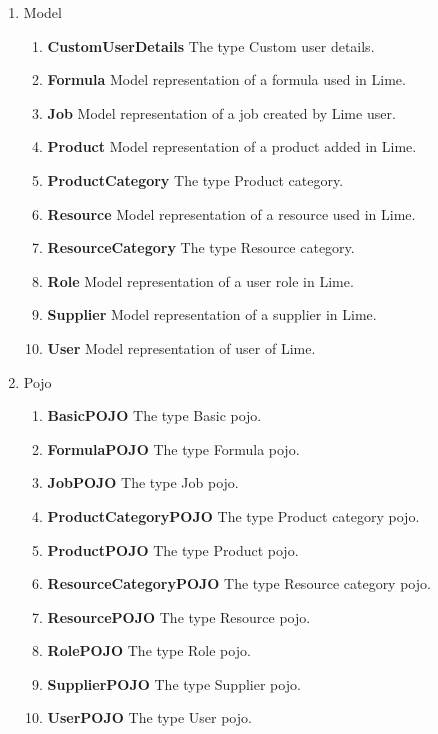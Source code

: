 \documentclass[a4paper,11pt,twoside]{report}
\theoremstyle{definition}
\begin{document}
\begin{enumerate}
\begin{enumerate}
\end{enumerate} 
\item Model	 
\begin{enumerate} 
\item \textbf{CustomUserDetails} The type Custom user details.
\item \textbf{Formula} Model representation of a formula used in Lime.
\item \textbf{Job} Model representation of a job created by Lime user.
\item \textbf{Product} Model representation of a product added in Lime.
\item \textbf{ProductCategory} The type Product category.
\item \textbf{Resource} Model representation of a resource used in Lime.
\item \textbf{ResourceCategory} The type Resource category.
\item \textbf{Role} Model representation of a user role in Lime.
\item \textbf{Supplier} Model representation of a supplier in Lime.
\item \textbf{User} Model representation of user of Lime.

\end{enumerate} 
\item Pojo	 
\begin{enumerate} 
\item \textbf{BasicPOJO} The type Basic pojo.
\item \textbf{FormulaPOJO} The type Formula pojo.
\item \textbf{JobPOJO} The type Job pojo.
\item \textbf{ProductCategoryPOJO} The type Product category pojo.
\item \textbf{ProductPOJO} The type Product pojo.
\item \textbf{ResourceCategoryPOJO} The type Resource category pojo.
\item \textbf{ResourcePOJO} The type Resource pojo.
\item \textbf{RolePOJO} The type Role pojo.
\item \textbf{SupplierPOJO} The type Supplier pojo.
\item \textbf{UserPOJO} The type User pojo.


\end{enumerate}
\end{enumerate}
\end{document}
